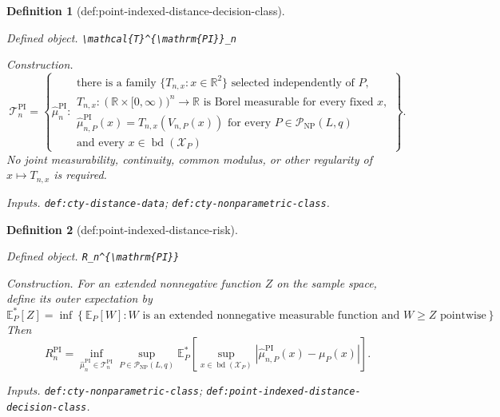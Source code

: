 \documentclass{article}
\newtheorem{definition}{Definition}
\begin{document}
\begin{definition}[def:point-indexed-distance-decision-class]\label{def:point-indexed-distance-decision-class}
\par\smallskip\noindent\emph{Defined object.} \texttt{\textbackslash{}\allowbreak{}mathcal\{T\}\allowbreak{}\textasciicircum{}\{\textbackslash{}\allowbreak{}mathrm\{PI\}\allowbreak{}\}\allowbreak{}\_\allowbreak{}n}
\par\smallskip\noindent\emph{Construction.} \[
 \mathcal T_n^{\mathrm{PI}}
 =\left\{\widehat\mu_n^{\mathrm{PI}}:\begin{array}{l}
 \text{there is a family }\{T_{n,x}:x\in\mathbb R^2\}\text{ selected independently of }P,\\
 T_{n,x}:(\mathbb R\times[0,\infty))^n\to\mathbb R
 \text{ is Borel measurable for every fixed }x,\\
 \widehat\mu_{n,P}^{\mathrm{PI}}(x)=T_{n,x}(V_{n,P}(x))
 \text{ for every }P\in\mathcal P_{\mathrm{NP}}(L,q)\\
 \text{and every }x\in\operatorname{bd}(\mathcal X_P)
 \end{array}\right\}.
\]
No joint measurability, continuity, common modulus, or other regularity of \(x\mapsto T_{n,x}\) is required.
\par\smallskip\noindent\emph{Inputs.} \texttt{def:\allowbreak{}cty-\allowbreak{}distance-\allowbreak{}data}; \texttt{def:\allowbreak{}cty-\allowbreak{}nonparametric-\allowbreak{}class}.
\end{definition}

\begin{definition}[def:point-indexed-distance-risk]\label{def:point-indexed-distance-risk}
\par\smallskip\noindent\emph{Defined object.} \texttt{R\_\allowbreak{}n\textasciicircum{}\{\textbackslash{}\allowbreak{}mathrm\{PI\}\allowbreak{}\}\allowbreak{}}
\par\smallskip\noindent\emph{Construction.} For an extended nonnegative function \(Z\) on the sample space, define its outer expectation by
\[
 \mathbb E_P^*[Z]
 =\inf\left\{\mathbb E_P[W]:
 W\text{ is an extended nonnegative measurable function and }W\geq Z
 \text{ pointwise}\right\}.
\]
Then
\[
 R_n^{\mathrm{PI}}
 =\inf_{\widehat\mu_n^{\mathrm{PI}}\in\mathcal T_n^{\mathrm{PI}}}
 \sup_{P\in\mathcal P_{\mathrm{NP}}(L,q)}
 \mathbb E_P^*\!\left[
 \sup_{x\in\operatorname{bd}(\mathcal X_P)}
 \left|\widehat\mu_{n,P}^{\mathrm{PI}}(x)-\mu_P(x)\right|
 \right].
\]
\par\smallskip\noindent\emph{Inputs.} \texttt{def:\allowbreak{}cty-\allowbreak{}nonparametric-\allowbreak{}class}; \texttt{def:\allowbreak{}point-\allowbreak{}indexed-\allowbreak{}distance-\allowbreak{}decision-\allowbreak{}class}.
\end{definition}
\end{document}
